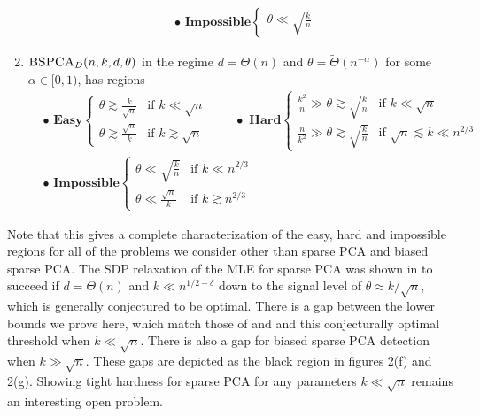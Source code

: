 \documentclass[11pt]{article}
\begin{document}
\begin{theorem}
\begin{enumerate}
\begin{align*}
& \bullet \, \, \mathbf{Impossible} \left\{ \begin{array}{ll} \theta \ll \sqrt{\frac{k}{n}} \end{array} \right.
\end{align*}
\item $\textsc{BSPCA}_D(n, k, d, \theta)$ in the regime $d = \Theta(n)$ and $\theta = \tilde{\Theta}(n^{-\alpha})$ for some $\alpha \in [0, 1)$, has regions
\begin{align*}
&\bullet \, \, \mathbf{Easy} \left\{ \begin{array}{ll} \theta \gtrsim \frac{k}{\sqrt{n}} &\text{if } k \ll \sqrt{n} \\ \theta \gtrsim \frac{\sqrt{n}}{k} &\text{if } k \gtrsim \sqrt{n} \end{array} \right. \quad \quad  \bullet \, \, \mathbf{Hard} \left\{ \begin{array}{ll} \frac{k^2}{n} \gg \theta \gtrsim \sqrt{\frac{k}{n}} &\text{if } k \ll \sqrt{n} \\ \frac{n}{k^2} \gg \theta \gtrsim \sqrt{\frac{k}{n}} &\text{if } \sqrt{n} \lesssim k \ll n^{2/3} \end{array} \right. \\
&\bullet \, \, \mathbf{Impossible} \left\{ \begin{array}{ll} \theta \ll \sqrt{\frac{k}{n}} &\text{if } k \ll n^{2/3} \\ \theta \ll \frac{\sqrt{n}}{k} &\text{if } k \gtrsim n^{2/3} \end{array} \right.
\end{align*}
\end{enumerate}
\end{theorem}

Note that this gives a complete characterization of the easy, hard and impossible regions for all of the problems we consider other than sparse PCA and biased sparse PCA. The SDP relaxation of the MLE for sparse PCA was shown in \cite{berthet2013optimal} to succeed if $d = \Theta(n)$ and $k \ll n^{1/2 - \delta}$ down to the signal level of $\theta \approx k/\sqrt{n}$, which is generally conjectured to be optimal. There is a gap between the lower bounds we prove here, which match those of \cite{berthet2013optimal} and \cite{gao2017sparse} and this conjecturally optimal threshold when $k \ll \sqrt{n}$. There is also a gap for biased sparse PCA detection when $k \gg \sqrt{n}$. These gaps are depicted as the black region in figures 2(f) and 2(g). Showing tight hardness for sparse PCA for any parameters $k \ll \sqrt{n}$ remains an interesting open problem.
\end{document}
